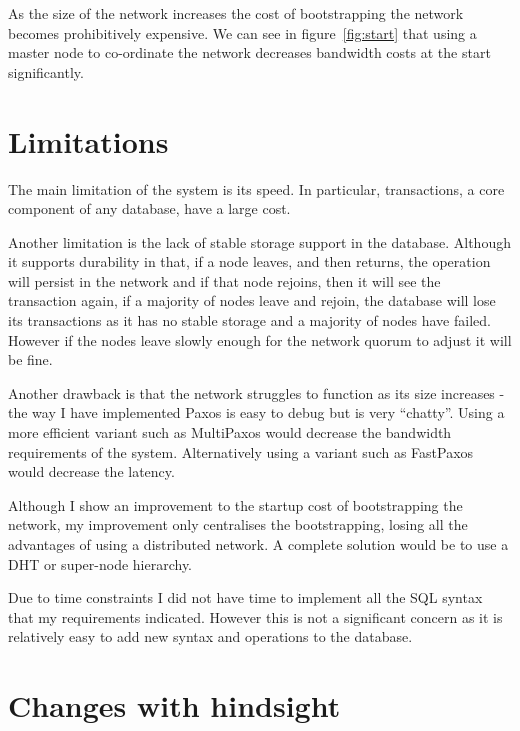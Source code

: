 \documentclass[12pt,twoside,notitlepage]{report}
\newcommand{\lwincludegraphics}[2][]{%
  \sbox{0}{\texttt{[image: \#2]}}%
  \ifdim\wd0>\linewidth
    \resizebox{\linewidth}{!}{\box0 }%
  \else
    \leavevmode\box0
  \fi}
\begin{document}

As the size of the network increases the cost of bootstrapping the network becomes prohibitively
expensive. We can see in figure~\ref{fig:start} that using a master node to co-ordinate the
network decreases bandwidth costs at the start significantly.

\section{Limitations}

The main limitation of the system is its speed. In particular, transactions, a core component of
any database, have a large cost.

Another limitation is the lack of stable storage support in the database. Although it supports
durability in that, if a node leaves, and then returns, the operation will persist in the network
and if that node rejoins, then it will see the transaction again, if a majority of nodes leave and
rejoin, the database will lose its transactions as it has no stable storage and a majority of
nodes have failed. However if the nodes leave slowly enough for the network quorum to adjust it
will be fine.

Another drawback is that the network struggles to function as its size increases - the way I have
implemented Paxos is easy to debug but is very ``chatty''. Using a more efficient variant such as
MultiPaxos would decrease the bandwidth requirements of the system. Alternatively using a variant
such as FastPaxos would decrease the latency.

Although I show an improvement to the startup cost of bootstrapping the network, my improvement
only centralises the bootstrapping, losing all the advantages of using a distributed network. A
complete solution would be to use a DHT or super-node hierarchy.

Due to time constraints I did not have time to implement all the SQL syntax that my requirements
indicated. However this is not a significant concern as it is relatively easy to add new syntax and
operations to the database.

\section{Changes with hindsight}
\end{document}
